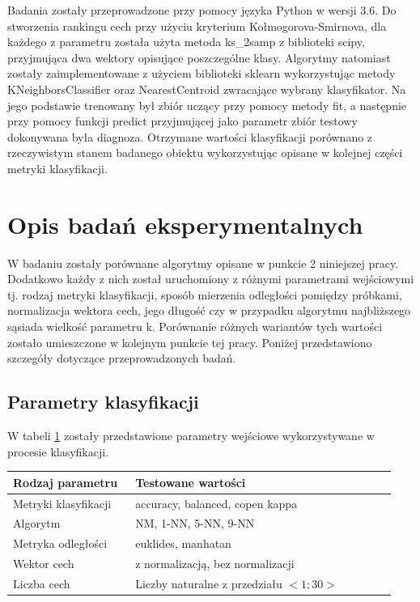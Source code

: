 \documentclass[12pt]{article}
\begin{document}
\indent Badania zostały przeprowadzone przy pomocy języka Python w wersji 3.6. Do stworzenia rankingu cech przy użyciu kryterium Kołmogorova-Smirnova, dla każdego z parametru została użyta metoda ks\_2samp z biblioteki scipy, przyjmująca dwa wektory opisujące poszczególne klasy. Algorytmy natomiast zostały zaimplementowane z użyciem biblioteki sklearn wykorzystując metody KNeighborsClassifier oraz NearestCentroid zwracające wybrany klasyfikator. Na jego podstawie trenowany był zbiór uczący przy pomocy metody fit, a następnie przy pomocy funkcji predict przyjmującej jako parametr zbiór testowy dokonywana była diagnoza. Otrzymane wartości klasyfikacji porównano z rzeczywistym stanem badanego obiektu wykorzystując opisane w kolejnej części metryki klasyfikacji.


\section{Opis badań eksperymentalnych}
\indent W badaniu zostały porównane algorytmy opisane w punkcie 2 niniejszej pracy. Dodatkowo każdy z nich został uruchomiony z różnymi parametrami wejściowymi tj. rodzaj metryki klasyfikacji, sposób mierzenia odległości pomiędzy próbkami, normalizacja wektora cech, jego długość czy w przypadku algorytmu najbliższego sąsiada wielkość parametru k. Porównanie różnych wariantów tych wartości zostało umieszczone w kolejnym punkcie tej pracy. Poniżej przedstawiono szczegóły dotyczące przeprowadzonych badań.\\

\subsection{Parametry klasyfikacji}
W tabeli \ref{parametry_klasyfiacji} zostały przedstawione parametry wejściowe wykorzystywane w procesie klasyfikacji.
\begin{table}[H]
\label{parametry_klasyfiacji}
	\begin{tabular}{|p{0.3\linewidth}|p{0.64\linewidth}|}%
	\hline\centering
	Rodzaj parametru 	& Testowane wartości 		\\ \hline\centering
	Metryki klasyfikacji	& accuracy, balanced, copen kappa \\ \hline\centering
	Algorytm	& NM, 1-NN, 5-NN, 9-NN \\ \hline\centering
	Metryka odległości	& euklides, manhatan \\ \hline\centering
	Wektor cech	& z normalizacją, bez normalizacji \\ \hline\centering
	Liczba cech	& Liczby naturalne z przedziału $<1;30>$ \\ \hline
	\end{tabular}
\end{table}
\end{document}
